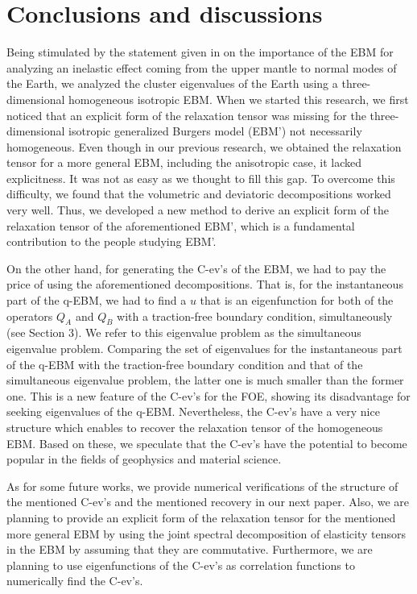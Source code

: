 \documentclass[a4paper,12pt]{article}
\newtheorem{a priori condition}[Th]{A priori condition}
\begin{document}
\section{Conclusions and discussions }
Being stimulated by the statement given in \cite{YP} on the importance of the EBM for analyzing an inelastic effect coming from the upper mantle to normal modes of the Earth, we analyzed the cluster eigenvalues of the Earth using a three-dimensional homogeneous isotropic EBM. When we started this research, we first noticed that an explicit form of the relaxation tensor was missing for the three-dimensional isotropic generalized Burgers model (EBM') not necessarily homogeneous. Even though in our previous research, we obtained the relaxation tensor for a more general EBM, including the anisotropic case, it lacked explicitness. It was not as easy as we thought to fill this gap. To overcome this difficulty, we found that the volumetric and deviatoric decompositions worked very well. Thus, we developed a new method to derive an explicit form of the relaxation tensor of the aforementioned EBM', which is a fundamental contribution to the people studying EBM'.

On the other hand, for generating the C-ev's of the EBM, we had to pay the price of using the aforementioned decompositions. That is, for the instantaneous part of the q-EBM, we had to find a $u$ that is an eigenfunction for both of the operators $Q_A$ and $Q_B$ with a traction-free boundary condition, simultaneously (see Section 3). We refer to this eigenvalue problem as the simultaneous eigenvalue problem. Comparing the set of eigenvalues for the instantaneous part of the q-EBM with the traction-free boundary condition and that of the simultaneous eigenvalue problem, the latter one is much smaller than the former one. This is a new feature of the C-ev's for the FOE, showing its disadvantage for seeking eigenvalues of the q-EBM. Nevertheless, the C-ev's have a very nice structure which enables to recover the relaxation tensor of the homogeneous EBM. Based on these, we speculate that the C-ev’s have the potential to become popular
in the fields of geophysics and material science.

As for some future works, we provide numerical verifications of the structure of the mentioned C-ev's and the mentioned recovery in our next paper. Also, we are planning to provide an explicit form of the relaxation tensor for the mentioned more general EBM by using the joint spectral decomposition of elasticity tensors in the EBM by assuming that they are commutative. Furthermore, we are planning to use eigenfunctions of the C-ev’s as correlation functions to numerically find the C-ev’s. 
\end{document}
